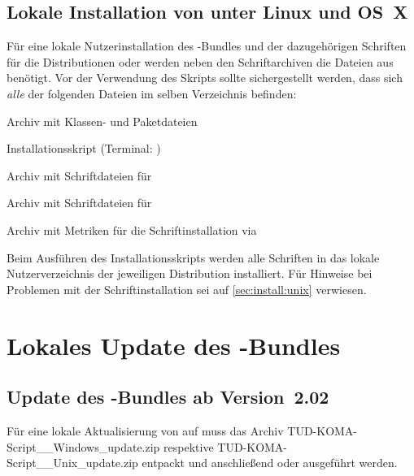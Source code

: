 \subsection{Lokale Installation von \TUDScript unter Linux und OS~X}
Für eine lokale Nutzerinstallation des \TUDScript-Bundles und der dazugehörigen 
Schriften für die Distributionen  oder 
 werden neben den Schriftarchiven die Dateien aus
%
{} benötigt. Vor der 
Verwendung des Skripts  sollte 
sichergestellt werden, dass sich \emph{alle} der folgenden Dateien im selben 
Verzeichnis befinden:
%
\begin{description}[labelwidth=\tempdim,labelsep=1em]
\settowidth{}%
  \item[\File{tudscr\_\vTUDScript.zip}]Archiv mit Klassen- und Paketdateien
  \item[\File{tudscr\_\vTUDScript\_install.sh}]Installationsskript
    (Terminal: )
  \item[\File{Univers\_PS.zip}]Archiv mit Schriftdateien für \Univers
  \item[\File{DIN\_Bd\_PS.zip}]Archiv mit Schriftdateien für \DIN
  \item[\File{tudscrfonts.zip}]Archiv mit Metriken für die
    Schriftinstallation via 
\end{description}
%
Beim Ausführen des Installationsskripts werden alle Schriften in das lokale 
Nutzerverzeichnis der jeweiligen Distribution installiert. Für Hinweise bei 
Problemen mit der Schriftinstallation sei auf \autoref{sec:install:unix} 
verwiesen.



\section{Lokales Update des \TUDScript-Bundles}
\label{sec:local:update}
%
%
\subsection{Update des \TUDScript-Bundles ab Version~2.02}
Für eine lokale Aktualisierung von \TUDScript auf \vTUDScript{} muss das Archiv
%
{TUD-KOMA-Script\_\vTUDScript\_Windows\_update.zip} respektive 
%
{TUD-KOMA-Script\_\vTUDScript\_Unix\_update.zip} entpackt und anschließend
 oder 
 ausgeführt werden.

